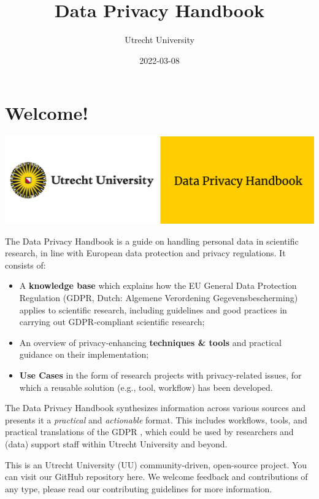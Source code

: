 \documentclass[
]{book}
\title{Data Privacy Handbook}
\author{Utrecht University}
\date{2022-03-08}
\providecommand{\tightlist}{%
  \setlength{\itemsep}{0pt}\setlength{\parskip}{0pt}}
\begin{document}
\maketitle

{
\setcounter{tocdepth}{1}
\tableofcontents
}
\hypertarget{welcome}{%
\chapter*{Welcome!}\label{welcome}}

\includegraphics{img/cover-image-dph.png}

The Data Privacy Handbook is a guide on handling personal data in scientific
research, in line with European data protection and privacy regulations. It
consists of:

\begin{itemize}
\tightlist
\item
  A \textbf{knowledge base} which explains how the EU General Data Protection Regulation (GDPR, Dutch: Algemene Verordening Gegevensbescherming) applies to scientific research, including guidelines and good practices in carrying out GDPR-compliant scientific research;
\item
  An overview of privacy-enhancing \textbf{techniques \& tools} and practical guidance on their implementation;
\item
  \textbf{Use Cases} in the form of research projects with privacy-related issues, for which a reusable solution (e.g., tool, workflow) has been developed.
\end{itemize}

The Data Privacy Handbook synthesizes information across various sources and
presents it a \emph{practical} and \emph{actionable} format. This includes workflows,
tools, and practical translations of the GDPR , which could be used by researchers
and (data) support staff within Utrecht University and beyond.

This is an Utrecht University (UU) community-driven, open-source project.
You can visit our GitHub repository here.
We welcome feedback and contributions of any type, please read our
contributing guidelines
for more information.
\end{document}
